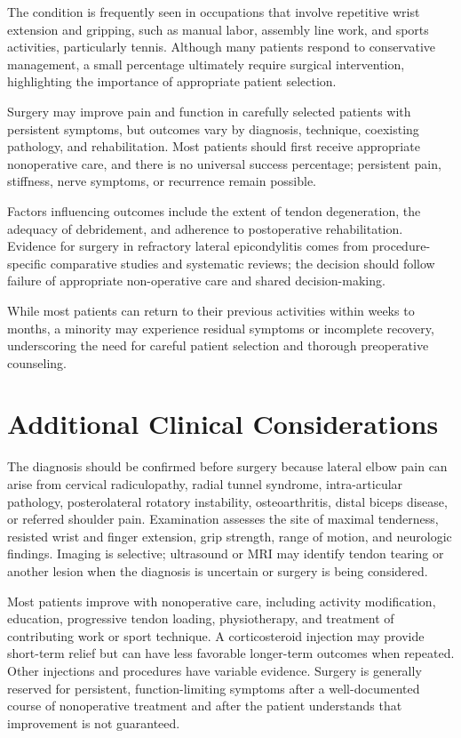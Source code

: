 The condition is frequently seen in occupations that involve repetitive wrist extension and gripping, such as manual labor, assembly line work, and sports activities, particularly tennis. Although many patients respond to conservative management, a small percentage ultimately require surgical intervention, highlighting the importance of appropriate patient selection.

Surgery may improve pain and function in carefully selected patients with persistent symptoms, but outcomes vary by diagnosis, technique, coexisting pathology, and rehabilitation. Most patients should first receive appropriate nonoperative care, and there is no universal success percentage; persistent pain, stiffness, nerve symptoms, or recurrence remain possible.

Factors influencing outcomes include the extent of tendon degeneration, the adequacy of debridement, and adherence to postoperative rehabilitation. Evidence for surgery in refractory lateral epicondylitis comes from procedure-specific comparative studies and systematic reviews; the decision should follow failure of appropriate non-operative care and shared decision-making.

While most patients can return to their previous activities within weeks to months, a minority may experience residual symptoms or incomplete recovery, underscoring the need for careful patient selection and thorough preoperative counseling.

\section*{Additional Clinical Considerations}
The diagnosis should be confirmed before surgery because lateral elbow pain can arise from cervical radiculopathy, radial tunnel syndrome, intra-articular pathology, posterolateral rotatory instability, osteoarthritis, distal biceps disease, or referred shoulder pain. Examination assesses the site of maximal tenderness, resisted wrist and finger extension, grip strength, range of motion, and neurologic findings. Imaging is selective; ultrasound or MRI may identify tendon tearing or another lesion when the diagnosis is uncertain or surgery is being considered.

Most patients improve with nonoperative care, including activity modification, education, progressive tendon loading, physiotherapy, and treatment of contributing work or sport technique. A corticosteroid injection may provide short-term relief but can have less favorable longer-term outcomes when repeated. Other injections and procedures have variable evidence. Surgery is generally reserved for persistent, function-limiting symptoms after a well-documented course of nonoperative treatment and after the patient understands that improvement is not guaranteed.

